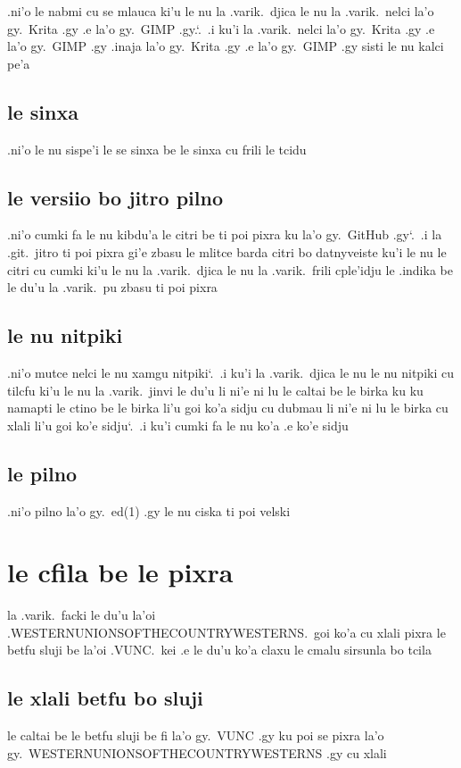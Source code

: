 \documentclass{report}
\newcommand\sds{\spacefactor\sfcode`.\ \space}
\begin{document}
.ni'o le nabmi cu se mlauca ki'u le nu la .varik.\ djica le nu la .varik.\ nelci la'o gy.\ Krita .gy .e la'o gy.\ GIMP .gy.\sds  .i ku'i la .varik.\ nelci la'o gy.\ Krita .gy .e la'o gy.\ GIMP .gy .inaja la'o gy.\ Krita .gy .e la'o gy.\ GIMP .gy sisti le nu kalci pe'a

\subsection{le sinxa}
.ni'o le nu sispe'i le se sinxa be le sinxa cu frili le tcidu

\subsection{le versiio bo jitro pilno}
.ni'o cumki fa le nu kibdu'a le citri be ti poi pixra ku la'o gy.\ GitHub .gy\sds  .i la .git.\ jitro ti poi pixra gi'e zbasu le mlitce barda citri bo datnyveiste
ku'i le nu le citri cu cumki ki'u le nu la .varik.\ djica le nu la .varik.\ frili cple'idju le .indika be le du'u la .varik.\ pu zbasu ti poi pixra

\subsection{le nu nitpiki}
.ni'o mutce nelci le nu xamgu nitpiki\sds  .i ku'i la .varik.\ djica le nu le nu nitpiki cu tilcfu ki'u le nu la .varik.\ jinvi le du'u li ni'e ni lu le caltai be le birka ku ku namapti le ctino be le birka li'u goi ko'a sidju cu dubmau li ni'e ni lu le birka cu xlali li'u goi ko'e sidju\sds  .i ku'i cumki fa le nu ko'a .e ko'e sidju

\subsection{le pilno}
.ni'o pilno la'o gy.\ ed(1) .gy le nu ciska ti poi velski

\section{le cfila be le pixra}
la .varik.\ facki le du'u la'oi .WESTERNUNIONSOFTHECOUNTRYWESTERNS.\ goi ko'a cu xlali pixra le betfu sluji be la'oi .VUNC.\ kei .e le du'u ko'a claxu le cmalu sirsunla bo tcila

\subsection{le xlali betfu bo sluji}
le caltai be le betfu sluji be fi la'o gy.\ VUNC .gy ku poi se pixra la'o gy.\ WESTERNUNIONSOFTHECOUNTRYWESTERNS .gy cu xlali
\end{document}
